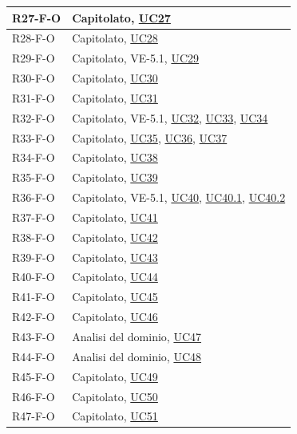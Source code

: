 \begin{longtable}{|p{2.8cm}|p{10.2cm}|}
	R27-F-O & Capitolato, \hyperlink{uc27}{UC27} \\ \hline
	R28-F-O & Capitolato, \hyperlink{uc28}{UC28} \\ \hline
	R29-F-O & Capitolato, VE-5.1, \hyperlink{uc29}{UC29} \\ \hline
	R30-F-O & Capitolato, \hyperlink{uc30}{UC30} \\ \hline
	R31-F-O & Capitolato, \hyperlink{uc31}{UC31} \\ \hline
	R32-F-O & Capitolato, VE-5.1, \hyperlink{uc32}{UC32}, \hyperlink{uc33}{UC33}, \hyperlink{uc34}{UC34} \\ \hline
	R33-F-O & Capitolato, \hyperlink{uc35}{UC35}, \hyperlink{uc36}{UC36}, \hyperlink{uc37}{UC37} \\ \hline
	R34-F-O & Capitolato, \hyperlink{uc38}{UC38} \\ \hline
	R35-F-O & Capitolato, \hyperlink{uc39}{UC39} \\ \hline
	R36-F-O & Capitolato, VE-5.1, \hyperlink{uc40}{UC40}, \hyperlink{uc40.1}{UC40.1}, \hyperlink{uc40.2}{UC40.2} \\ \hline
	R37-F-O & Capitolato, \hyperlink{uc41}{UC41} \\ \hline
	R38-F-O & Capitolato, \hyperlink{uc42}{UC42} \\ \hline
	R39-F-O & Capitolato, \hyperlink{uc43}{UC43} \\ \hline
	R40-F-O & Capitolato, \hyperlink{uc44}{UC44} \\ \hline
	R41-F-O & Capitolato, \hyperlink{uc45}{UC45} \\ \hline
	R42-F-O & Capitolato, \hyperlink{uc46}{UC46} \\ \hline
	R43-F-O & Analisi del dominio, \hyperlink{uc47}{UC47} \\ \hline
	R44-F-O & Analisi del dominio, \hyperlink{uc48}{UC48} \\ \hline
	R45-F-O & Capitolato, \hyperlink{uc49}{UC49} \\ \hline
	R46-F-O & Capitolato, \hyperlink{uc50}{UC50} \\ \hline
	R47-F-O & Capitolato, \hyperlink{uc51}{UC51} \\ \hline
	

\end{longtable}

